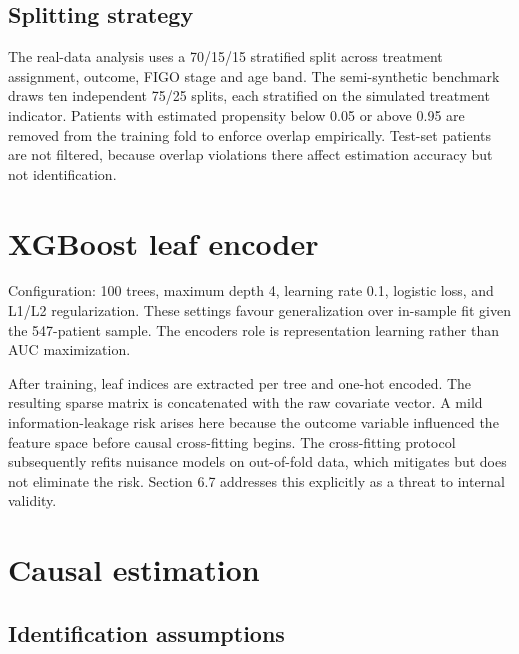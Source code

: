 \subsection{Splitting strategy}\label{splitting-strategy}

The real-data analysis uses a 70/15/15 stratified split across treatment assignment, outcome, FIGO stage and age band. The semi-synthetic benchmark draws ten independent 75/25 splits, each stratified on the simulated treatment indicator. Patients with estimated propensity below 0.05 or above 0.95 are removed from the training fold to enforce overlap empirically. Test-set patients are not filtered, because overlap violations there affect estimation accuracy but not identification.

\section{XGBoost leaf encoder}\label{xgboost-leaf-encoder}

Configuration: 100 trees, maximum depth 4, learning rate 0.1, logistic loss, and L1/L2 regularization. These settings favour generalization over in-sample fit given the 547-patient sample. The encoder\textquotesingle s role is representation learning rather than AUC maximization.

After training, leaf indices are extracted per tree and one-hot encoded. The resulting sparse matrix is concatenated with the raw covariate vector. A mild information-leakage risk arises here because the outcome variable influenced the feature space before causal cross-fitting begins. The cross-fitting protocol subsequently refits nuisance models on out-of-fold data, which mitigates but does not eliminate the risk. Section 6.7 addresses this explicitly as a threat to internal validity.

\section{Causal estimation}\label{causal-estimation}

\subsection{Identification assumptions}\label{identification-assumptions}

